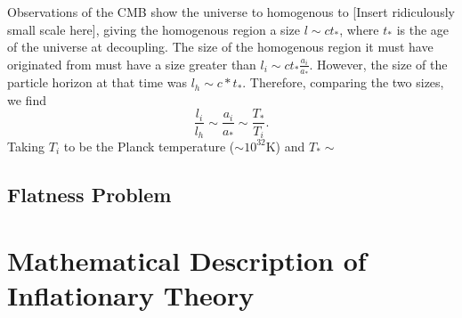 \documentclass[a4paper,11pt]{article}
\begin{document}
Observations of the CMB show the universe to homogenous to [Insert ridiculously small scale here], giving the homogenous region a size $l \sim c t_*$, where $t_*$ is the age of the universe at decoupling. The size of the homogenous region it must have originated from must have a size greater than $l_i \sim c t_* \tfrac{a_i}{a_*}$. However, the size of the particle horizon at that time was $l_h \sim c*t_*$. Therefore, comparing the two sizes, we find
\begin{equation}
\frac{l_i}{l_h} \sim \frac{a_i}{a_*} \sim \frac{T_*}{T_i}.
\end{equation}
 Taking $T_i$ to be the Planck temperature ($\sim 10^{32}$K) and $T_* \sim $

\subsection{Flatness Problem}
\label{sec:Flatness}

\newpage
\section{Mathematical Description of Inflationary Theory}
\end{document}
